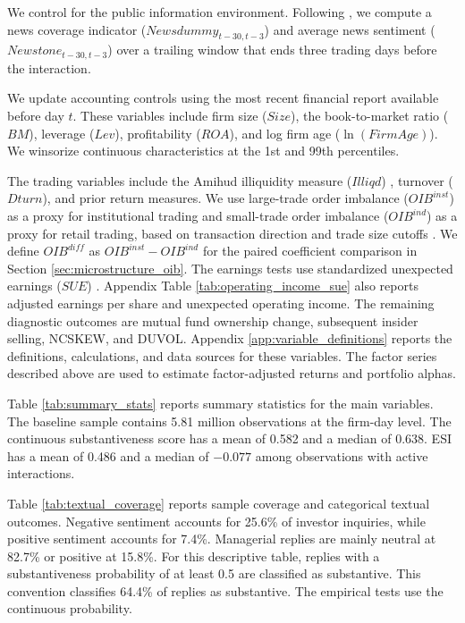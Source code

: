 \documentclass[12pt]{article}
\begin{document}
We control for the public information environment. Following \citet{chen2014}, we compute a news coverage indicator ($Newsdummy_{t-30,t-3}$) and average news sentiment ($Newstone_{t-30,t-3}$) over a trailing window that ends three trading days before the interaction.

We update accounting controls using the most recent financial report available before day $t$. These variables include firm size ($Size$), the book-to-market ratio ($BM$), leverage ($Lev$), profitability ($ROA$), and log firm age ($\ln(\textit{FirmAge})$). We winsorize continuous characteristics at the 1st and 99th percentiles.

The trading variables include the Amihud illiquidity measure ($Illiqd$) \citep{amihud2002illiquidity}, turnover ($Dturn$), and prior return measures. We use large-trade order imbalance ($OIB^{inst}$) as a proxy for institutional trading and small-trade order imbalance ($OIB^{ind}$) as a proxy for retail trading, based on transaction direction and trade size cutoffs \citep{lee1992,lee1991inferring,tong2013}. We define $OIB^{diff}$ as $OIB^{inst}-OIB^{ind}$ for the paired coefficient comparison in Section \ref{sec:microstructure_oib}. The earnings tests use standardized unexpected earnings ($SUE$) \citep{bernard1989post}. Appendix Table \ref{tab:operating_income_sue} also reports adjusted earnings per share and unexpected operating income. The remaining diagnostic outcomes are mutual fund ownership change, subsequent insider selling, NCSKEW, and DUVOL. Appendix \ref{app:variable_definitions} reports the definitions, calculations, and data sources for these variables. The factor series described above are used to estimate factor-adjusted returns and portfolio alphas.

Table \ref{tab:summary_stats} reports summary statistics for the main variables. The baseline sample contains 5.81 million observations at the firm-day level. The continuous substantiveness score has a mean of 0.582 and a median of 0.638. ESI has a mean of 0.486 and a median of $-0.077$ among observations with active interactions.

Table \ref{tab:textual_coverage} reports sample coverage and categorical textual outcomes. Negative sentiment accounts for 25.6\% of investor inquiries, while positive sentiment accounts for 7.4\%. Managerial replies are mainly neutral at 82.7\% or positive at 15.8\%. For this descriptive table, replies with a substantiveness probability of at least 0.5 are classified as substantive. This convention classifies 64.4\% of replies as substantive. The empirical tests use the continuous probability.
\end{document}
